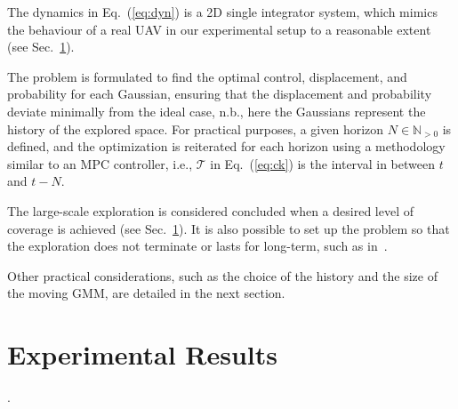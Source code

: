 \documentclass[letterpaper,10pt,conference,twoside]{IEEEtran}
\theoremstyle{definition}
\begin{document}
The dynamics in Eq.~(\ref{eq:dyn}) is a 2D single integrator system, which mimics the behaviour of a real UAV in our experimental setup to a reasonable extent (see Sec.~\ref{sec:res}).

The problem is formulated to find the optimal control, displacement, and probability for each Gaussian, ensuring that the displacement and probability deviate minimally from the ideal case, n.b., here the Gaussians represent the history of the explored space. For practical purposes, a given horizon $N \in \mathbb{N}_{>0}$ is defined, and the optimization is reiterated for each horizon using a methodology similar to an MPC controller, i.e., $\mathcal{T}$ in Eq.~(\ref{eq:ck}) is the interval in between $t$ and $t-N$.

The large-scale exploration is considered concluded when a desired level of coverage is achieved (see Sec.~\ref{sec:res}). It is also possible to set up the problem so that the exploration does not terminate or lasts for long-term, such as in~\cite{seewald2022energy}.

Other practical considerations, such as the choice of the history and the size of the moving GMM, are detailed in the next section.

\section{Experimental Results}\label{sec:res}
\noindent
.

~
\newpage
\end{document}
